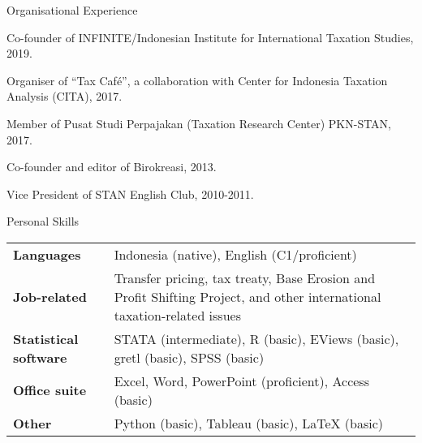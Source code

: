 \documentclass{resume}
\begin{document}
\begin{rSection}{Organisational Experience} 
\item Co-founder of INFINITE/Indonesian Institute for International Taxation Studies, 2019.
\item Organiser of “Tax Café”, a collaboration with Center for Indonesia Taxation Analysis (CITA), 2017.
\item Member of Pusat Studi Perpajakan (Taxation Research Center) PKN-STAN, 2017.
\item Co-founder and editor of Birokreasi, 2013.
\item Vice President of STAN English Club, 2010-2011.
\end{rSection}

\begin{rSection}{Personal Skills}

\begin{tabular}{p{4cm}p{12cm}}
\textbf{Languages} & Indonesia (native), English (C1/proficient) \\
\textbf{Job-related} & Transfer pricing, tax treaty, Base Erosion and Profit Shifting Project, and other international taxation-related issues\\
\textbf{Statistical software} & STATA (intermediate), R (basic), EViews (basic), gretl (basic), SPSS (basic) \\
\textbf{Office suite} & Excel, Word, PowerPoint (proficient), Access (basic)\\
\textbf{Other} & Python (basic), Tableau (basic), {\LaTeX} (basic)\\

\end{tabular}

\end{rSection}
\end{document}
